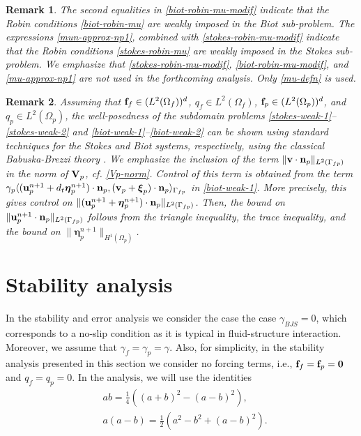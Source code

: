 \documentclass[11pt]{article}
\def\u{{\bf u}}
\def\bv{{\bf v}}
\def\n{{\bf n}}
\def\f{{\bf f}}
\def\bbeta{\boldsymbol{\eta}}
\def\bxi{\boldsymbol{\xi}}
\def\V{{\bf V}}
\def\<{\langle}
\def\>{\rangle}
\def\dt{d_t}
\newtheorem{remark}{Remark}[section]
\begin{document}
\begin{remark}
    The second equalities in \eqref{biot-robin-mu-modif} indicate that the Robin conditions \eqref{biot-robin-mu}  are weakly imposed in the Biot sub-problem. The expressions \eqref{mun-approx-np1}, combined with \eqref{stokes-robin-mu-modif}  indicate that the Robin conditions \eqref{stokes-robin-mu} are weakly imposed in the Stokes sub-problem. We emphasize that \eqref{stokes-robin-mu-modif}, \eqref{biot-robin-mu-modif}, and \eqref{mu-approx-np1} are not used in the forthcoming analysis. Only \eqref{mu-defn} is used.
    \end{remark}
%
  \begin{remark}
Assuming that  $\f_f \in (L^2(\Omega_f))^d$, $q_f \in L^2(\Omega_f)$, $\f_p \in (L^2(\Omega_p))^d$, and $q_p \in L^2(\Omega_p)$, the well-posedness of the subdomain problems \eqref{stokes-weak-1}--\eqref{stokes-weak-2} and
\eqref{biot-weak-1}--\eqref{biot-weak-2} can be shown using standard techniques for the Stokes and Biot systems, respectively, using the classical Babuska-Brezzi theory \cite{boffi2013mixed}. We emphasize the inclusion of the term $\|\bv\cdot\n_p\|_{L^2(\Gamma_{fp})}$ in the norm of $\V_p$, cf. \eqref{Vp-norm}. Control of this term is obtained from the term $\gamma_p\<(\u_p^{n+1} + \dt\bbeta_p^{n+1})\cdot\n_p,(\bv_p + \bxi_p)\cdot\n_p\>_{\Gamma_{fp}}$ in \eqref{biot-weak-1}. More precisely, this gives control on $\|(\u_p^{n+1} + \bbeta_p^{n+1})\cdot\n_p\|_{L^2(\Gamma_{fp})}$. Then, the bound on $\|\u_p^{n+1}\cdot\n_p\|_{L^2(\Gamma_{fp})}$ follows from the triangle inequality, the trace inequality, and the bound on $\|\bbeta_p^{n+1}\|_{H^1(\Omega_p)}$.
\end{remark}

\section{Stability analysis}\label{sec:stab}

In the stability and error analysis we consider the case the case $\gamma_{BJS} = 0$, {which corresponds to a no-slip condition as it is typical in fluid-structure interaction}. Moreover,
we assume that $\gamma_f = \gamma_p = \gamma$. Also, for simplicity, in the stability analysis presented in this section we consider no forcing terms, i.e., $\f_f = \f_p = \boldsymbol{0}$ and $q_f = q_p = 0$.
In the analysis, we will use the identities
%
\begin{align}
& ab = \frac{1}{4}\left((a+b)^2 - (a-b)^2\right), \label{identity-A1}\\
& a(a-b) = \frac{1}{2}(a^2 - b^2 + (a-b)^2). \label{identity-A2}
\end{align}
\end{document}
